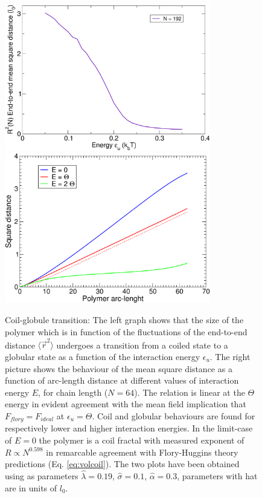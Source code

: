 \documentclass[12pt,a4paper,notitlepage]{article}
\begin{document}
\begin{figure}[h!]
\centering
\includegraphics[width=9cm]{collapse}\includegraphics[width=9cm]{merrUno}\\
\caption{Coil-globule transition: The left graph shows that the size of the
  polymer which is in  function of the fluctuations of the end-to-end
  distance $\langle \vec r^2 \rangle$ undergoes a transition from a coiled
  state to a globular state as a function of the interaction energy
  $\epsilon_u$. The right picture shows the behaviour of the mean
  square distance as a function of arc-length distance at different
  values of interaction energy $E$, for chain length
  ($N = 64$). The relation is linear at the $\Theta$ energy in evident
  agreement with the mean field implication that $F_{flory} =
  F_{ideal}$ at $\epsilon_u = \Theta$. Coil and globular behaviours
  are found for respectively lower and  higher interaction
  energies. In the limit-case of $E = 0$ the polymer is a coil fractal
  with measured exponent of $R \propto N^{0.598}$ in remarcable
  agreement with Flory-Huggins theory predictions
  (Eq. \ref{eq:volcoil}). The two plots have been obtained using as
  parameters $\hat \lambda = 0.19$, $\hat \sigma = 0.1$, $\hat \alpha
  =0.3$, parameters with hat are in units of $l_0$.}
\label{fig:collapse}
\end{figure}
\end{document}
